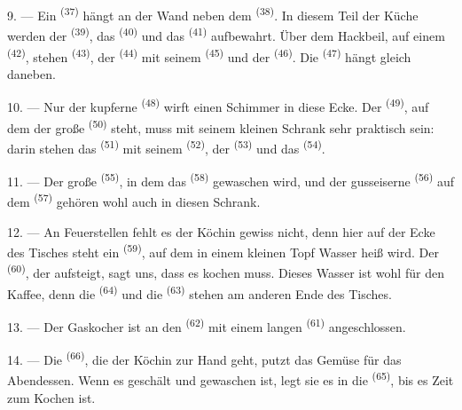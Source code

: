 9. --- Ein  \textsuperscript{(37)} hängt an der Wand neben dem
 \textsuperscript{(38)}. In diesem Teil der Küche werden der
 \textsuperscript{(39)}, das  \textsuperscript{(40)}
und das  \textsuperscript{(41)} aufbewahrt. Über dem Hackbeil, auf
einem  \textsuperscript{(42)}, stehen 
\textsuperscript{(43)}, der  \textsuperscript{(44)} mit seinem
 \textsuperscript{(45)} und der 
\textsuperscript{(46)}. Die  \textsuperscript{(47)} hängt gleich
daneben.

10. --- Nur der kupferne  \textsuperscript{(48)} wirft einen Schimmer in
diese Ecke. Der  \textsuperscript{(49)}, auf dem der große
 \textsuperscript{(50)} steht, muss mit seinem kleinen Schrank sehr
praktisch sein: darin stehen das  \textsuperscript{(51)} mit seinem
 \textsuperscript{(52)}, der 
\textsuperscript{(53)} und das  \textsuperscript{(54)}.

\VUsaut{4.0mm}
\VUsaut{3.0mm}

11. --- Der große  \textsuperscript{(55)}, in dem das 
\textsuperscript{(58)} gewaschen wird, und der gusseiserne 
\textsuperscript{(56)} auf dem  \textsuperscript{(57)} gehören
wohl auch in diesen Schrank.

12. --- An Feuerstellen fehlt es der Köchin gewiss nicht, denn hier auf der Ecke des
Tisches steht ein  \textsuperscript{(59)}, auf dem in einem kleinen
Topf Wasser heiß wird. Der  \textsuperscript{(60)}, der aufsteigt,
sagt uns, dass es kochen muss. Dieses Wasser ist wohl für den Kaffee, denn die
 \textsuperscript{(64)} und die 
\textsuperscript{(63)} stehen am anderen Ende des Tisches.

13. --- Der Gaskocher ist an den  \textsuperscript{(62)} mit
einem langen  \textsuperscript{(61)} angeschlossen.

14. --- Die  \textsuperscript{(66)}, die der Köchin zur
Hand geht, putzt das Gemüse für das Abendessen. Wenn es geschält und gewaschen ist,
legt sie es in die  \textsuperscript{(65)}, bis es Zeit zum Kochen
ist.

